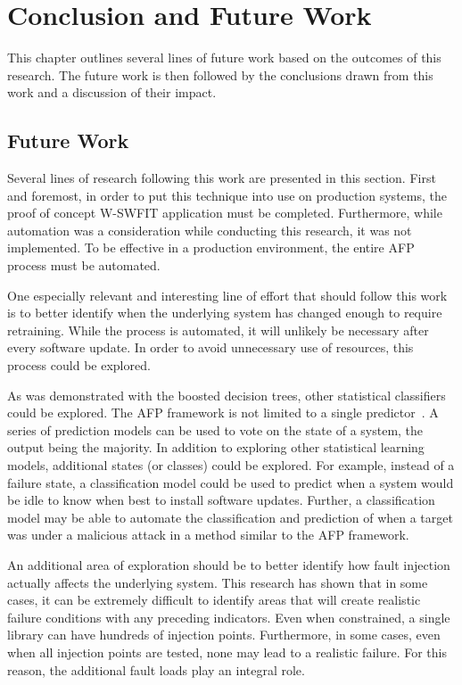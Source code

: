 \chapter{Conclusion and Future Work} \label{chapter5}
This chapter outlines several lines of future work based on the outcomes of
this research.  The future work is then followed by the conclusions drawn from
this work and a discussion of their impact.

\section{Future Work}
Several lines of research following this work are presented in this section.
First and foremost, in order to put this technique into use on production
systems, the proof of concept \ac{W-SWFIT} application must be completed.
Furthermore, while automation was a consideration while conducting this
research, it was not implemented.  To be effective in a production environment,
the entire \ac{AFP} process must be automated.

One especially relevant and interesting line of effort that should follow this
work is to better identify when the underlying system has changed enough to
require retraining.  While the process is automated, it will unlikely be
necessary after every software update.  In order to avoid unnecessary use of
resources, this process could be explored.

As was demonstrated with the boosted decision trees, other statistical
classifiers could be explored.  The \ac{AFP} framework is not limited to a
single predictor~\cite{irrera2015}.  A series of prediction models can be used
to vote on the state of a system, the output being the majority.  In addition
to exploring other statistical learning models, additional states (or classes)
could be explored.  For example, instead of a failure state, a classification
model could be used to predict when a system would be idle to know when best to
install software updates.  Further, a classification model may be able to
automate the classification and prediction of when a target was under a
malicious attack in a method similar to the \ac{AFP} framework.

An additional area of exploration should be to better identify how fault
injection actually affects the underlying system.  This research has shown that
in some cases, it can be extremely difficult to identify areas that will create
realistic failure conditions with any preceding indicators.  Even when
constrained, a single library can have hundreds of injection points.
Furthermore, in some cases, even when all injection points are tested, none may
lead to a realistic failure.  For this reason, the additional fault loads play
an integral role.

